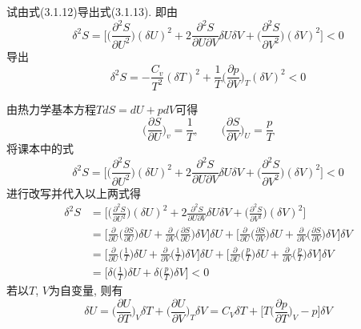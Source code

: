 \begin{problem}[3.2]
试由式(3.1.12)导出式(3.1.13). 即由
\[
\delta^2 S=\Bigg[\bigg(\frac{\partial^2S}{\partial U^2}\bigg)(\delta U)^2 + 2\frac{\partial^2 S}{\partial U\partial V}\delta U\delta V + \bigg(\frac{\partial^2 S}{\partial V^2}\bigg)(\delta V)^2\Bigg]<0
\]
导出
\[
\delta^2 S = -\frac{C_v}{T^2}(\delta T)^2 + \frac{1}{T}\bigg(\frac{\partial p}{\partial V}\bigg)_T(\delta V)^2 < 0
\]
\end{problem}
\begin{solution}
由热力学基本方程$TdS = dU + pdV$可得
\[
\bigg(\frac{\partial S}{\partial U}\bigg)_v = \frac{1}{T},
\qquad 
\bigg(\frac{\partial S}{\partial V}\bigg)_U = \frac{p}{T}
\]
将课本中的式
\begin{equation}\tag{3.1.12}
\delta^2 S = \Bigg[
\bigg(\frac{\partial^2S}{\partial U^2}\bigg) (\delta U)^2 
+ 2 \frac{\partial^2S}{\partial U\partial V}\delta U\delta V
+ \bigg(\frac{\partial^2S}{\partial V^2}\bigg) (\delta V)^2 
\Bigg] <0
\end{equation}
进行改写并代入以上两式得
\begin{align}\label{eq:delta2s}
\delta^{2}S & =\Bigg[\bigg(\frac{\partial^{2}S}{\partial U^{2}}\bigg)(\delta U)^{2}+2\frac{\partial^{2}S}{\partial U\partial V}\delta U\delta V+\bigg(\frac{\partial^{2}S}{\partial V^{2}}\bigg)(\delta V)^{2}\Bigg]\nonumber\\
 & =\Bigg[\frac{\partial}{\partial U}\bigg(\frac{\partial S}{\partial U}\bigg)\delta U+\frac{\partial}{\partial V}\bigg(\frac{\partial S}{\partial U}\bigg)\delta V\Bigg]\delta U+\Bigg[\frac{\partial}{\partial U}\bigg(\frac{\partial S}{\partial V}\bigg)\delta U+\frac{\partial}{\partial V}\bigg(\frac{\partial S}{\partial V}\bigg)\delta V\Bigg]\delta V\nonumber\\
 & =\Bigg[\frac{\partial}{\partial U}\bigg(\frac{1}{T}\bigg)\delta U+\frac{\partial}{\partial V}\bigg(\frac{1}{T}\bigg)\delta V\Bigg]\delta U+\Bigg[\frac{\partial}{\partial U}\bigg(\frac{p}{T}\bigg)\delta U+\frac{\partial}{\partial V}\bigg(\frac{p}{T}\bigg)\delta V\Bigg]\delta V\nonumber\\
 & =\Bigg[\delta\bigg(\frac{1}{T}\bigg)\delta U+\delta\bigg(\frac{p}{T}\bigg)\delta V\Bigg]<0
\end{align}
若以$T$, $V$为自变量, 则有
\begin{equation}\label{eq:deltaU}
\delta U = \Big(\frac{\partial U}{\partial T}\Big)_V \delta T + \Big(\frac{\partial U}{\partial V}\Big)_T \delta V
= C_V \delta T + \Bigg[ T\bigg(\frac{\partial p}{\partial T}\bigg)_V - p \Bigg]\delta V
\end{equation}


\end{solution}
